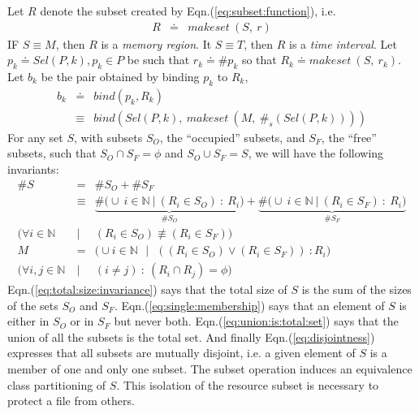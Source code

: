 \documentclass[draft]{article}
\def\names{\doteq}
\def\eqn#1{Eqn.(\ref{#1})}
\begin{document}
Let $R$ denote the subset created by \eqn{eq:subset:function}, i.e.
\begin{eqnarray}
  \label{eq:mem:subset}
  R &\names& makeset\ (S,\ r)
\end{eqnarray}
IF $S \equiv M$, then $R$ is a \emph{memory region}.  It $S \equiv T$,
then $R$  is a \emph{time interval}.   Let $p_k \names  Sel(P, k), p_k
\in P$  be such that $r_k  \names \#p_k$ so that  $R_k \names makeset\
(S,\ r_k)$.  Let $b_k$ be the pair obtained by binding $p_k$ to $R_k$,
\begin{eqnarray}
  \label{eq:mem:bind}
  b_k 
  &\names& bind(p_k, R_k)
  \nonumber \\
  &\equiv& bind(Sel(P, k),\ makeset\ (M,\ \#_s(Sel(P, k))))
\end{eqnarray}
For any  set $S$,  with subsets $S_O$,  the ``occupied''  subsets, and
$S_F$, the ``free'' subsets, such that  $S_O \cap S_F = \phi$ and $S_O
\cup S_F = S$, we will have the following invariants:
\begin{eqnarray}
  \label{eq:total:size:invariance}
  \#S 
  &=& \#S_O + \#S_F \nonumber \\
  &\equiv& 
  \underbrace{\#\bigl(\cup \ i \in \mathbb{N}\ \vert\ (R_i \in S_O)\
    :\ R_i \bigr)}_{\#S_O}  +
  \underbrace{\#\bigl(\cup\ i \in \mathbb{N}\ \vert\ (R_i \in S_F)\ :\
    R_i \bigr)}_{\#S_F} \\ 
  \label{eq:single:membership}
  \bigl(\forall i \in \mathbb{N}\ &\vert& (R_i \in S_O) \not \equiv (R_i
  \in S_F)\bigr) \\
  \label{eq:union:is:total:set}
  M &=& \bigl(\cup i \in \mathbb{N}\ \ \ \vert\ \ \ ((R_i \in S_O) \vee
  (R_i \in S_F))\ : R_i\bigr) \\
  \label{eq:disjointness}
  \bigl(\forall i,j \in \mathbb{N}\ &\vert& (i \not = j)\ :\ (R_i \cap
  R_j) = \phi\bigr)
\end{eqnarray}
\eqn{eq:total:size:invariance} says that the  total size of $S$ is the
sum    of    the   sizes    of    the    sets    $S_O$   and    $S_F$.
\eqn{eq:single:membership} says  that an element  of $S$ is  either in
$S_O$ or  in $S_F$  but never both.   \eqn{eq:union:is:total:set} says
that  the union  of all  the subsets  is the  total set.   And finally
\eqn{eq:disjointness}   expresses  that   all  subsets   are  mutually
disjoint, i.e. a given element of $S$  is a member of one and only one
subset.    The   subset  operation   induces   an  equivalence   class
partitioning  of  $S$.   This  isolation  of the  resource  subset  is
necessary to protect a file from others.
\end{document}
